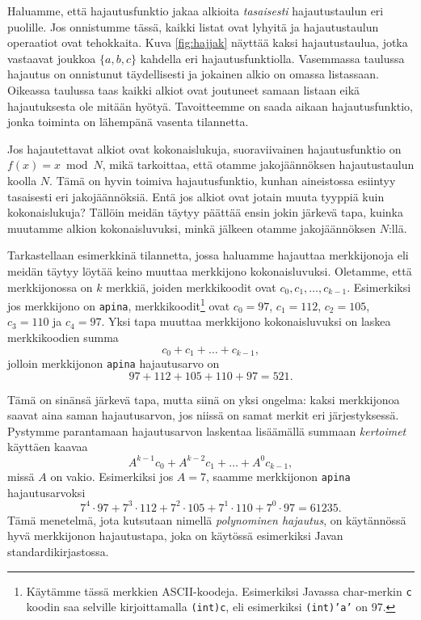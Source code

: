 Haluamme, että hajautusfunktio jakaa alkioita \emph{tasaisesti}
hajautustaulun eri puolille.
Jos onnistumme tässä, kaikki listat ovat lyhyitä ja
hajautustaulun operaatiot ovat tehokkaita.
Kuva \ref{fig:hajjak} näyttää kaksi hajautustaulua, jotka vastaavat
joukkoa $\{a,b,c\}$ kahdella eri hajautusfunktiolla.
Vasemmassa taulussa hajautus on onnistunut täydellisesti
ja jokainen alkio on omassa listassaan.
Oikeassa taulussa taas kaikki alkiot ovat joutuneet samaan
listaan eikä hajautuksesta ole mitään hyötyä.
Tavoitteemme on saada aikaan hajautusfunktio,
jonka toiminta on lähempänä vasenta tilannetta.

Jos hajautettavat alkiot ovat kokonaislukuja,
suoraviivainen hajautusfunktio on $f(x)=x \bmod N$,
mikä tarkoittaa, että otamme jakojäännöksen hajautustaulun koolla $N$.
Tämä on hyvin toimiva hajautusfunktio,
kunhan aineistossa esiintyy tasaisesti eri jakojäännöksiä.
Entä jos alkiot ovat jotain muuta tyyppiä kuin kokonaislukuja?
Tällöin meidän täytyy päättää ensin jokin järkevä tapa,
kuinka muutamme alkion kokonaisluvuksi,
minkä jälkeen otamme jakojäännöksen $N$:llä.

Tarkastellaan esimerkkinä tilannetta, jossa haluamme hajauttaa merkkijonoja
eli mei\-dän täytyy löytää keino muuttaa merkkijono kokonaisluvuksi.
Oletamme, että merkkijonossa on $k$ merkkiä,
joiden merkkikoodit ovat $c_0,c_1,\dots,c_{k-1}$.
Esimerkiksi jos merkkijono on \texttt{apina},
merkkikoodit\footnote{Käytämme tässä merkkien ASCII-koodeja.
Esimerkiksi Javassa char-merkin \texttt{c} koodin saa
selville kirjoittamalla \texttt{(int)c}, eli esimerkiksi
\texttt{(int)'a'} on 97.} ovat $c_0=97$, $c_1=112$, $c_2=105$,
$c_3=110$ ja $c_4=97$.
Yksi tapa muuttaa merkkijono kokonaisluvuksi
on laskea merkkikoodien summa
\[ c_0 + c_1 + \dots + c_{k-1},\]
jolloin merkkijonon \texttt{apina} hajautusarvo on
\[97+112+105+110+97=521.\]


Tämä on sinänsä järkevä tapa, mutta siinä on yksi ongelma:
kaksi merkkijonoa saavat aina saman hajautusarvon,
jos niissä on samat merkit eri järjestyksessä.
Pystymme parantamaan hajautusarvon laskentaa lisäämällä
summaan \emph{kertoimet} käyttäen kaavaa
\[ A^{k-1} c_0 + A^{k-2} c_1 + \dots + A^0 c_{k-1},\]
missä $A$ on vakio.
Esimerkiksi jos $A=7$, saamme merkkijonon \texttt{apina} hajautusarvoksi
\[7^4 \cdot 97+7^3 \cdot 112+7^2 \cdot 105+7^1 \cdot 110+7^0 \cdot 97=61235.\]
Tämä menetelmä, jota kutsutaan nimellä \emph{polynominen hajautus},
on käytän\-nössä hyvä merkkijonon hajautustapa,
joka on käytössä esimerkiksi Javan standardikirjastossa.

